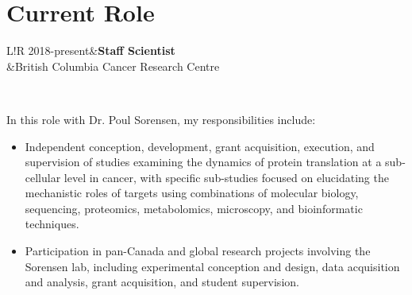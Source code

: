 \documentclass[11pt]{article}
\newcommand\VRule{\color{lightgray}\vrule width 0.5pt}
\begin{document}
\begin{addmargin}[3em]{2em}
\begin{itemize}
	\end{itemize}
\end{addmargin}

\section*{Current Role}
\begin{tabular}{L!{\VRule}R}
	2018-present&\textbf{Staff Scientist}\\
	&British Columbia Cancer Research Centre\\
\end{tabular}\\

\begin{addmargin}[7.5em]{2em}%
	In this role with Dr. Poul Sorensen, my responsibilities include:
	\begin{itemize}
		\item Independent conception, development, grant acquisition, execution, and supervision of studies examining the dynamics of protein translation at a sub-cellular level in cancer, with specific sub-studies focused on elucidating the mechanistic roles of targets using combinations of molecular biology, sequencing, proteomics, metabolomics, microscopy, and bioinformatic techniques.
		\item Participation in pan-Canada and global research projects involving the Sorensen lab, including experimental conception and design, data acquisition and analysis, grant acquisition, and student supervision.
	\end{itemize}
\end{addmargin}
\end{document}
